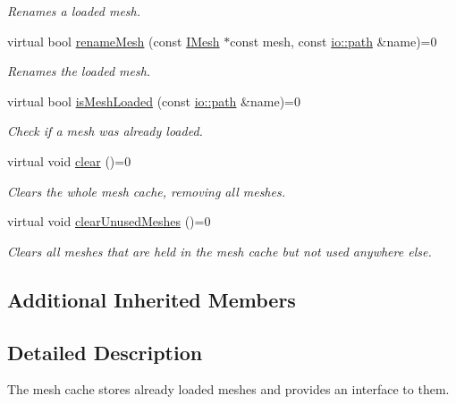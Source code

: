 \begin{DoxyCompactItemize}
\begin{DoxyCompactList}\small\item\em Renames a loaded mesh. \end{DoxyCompactList}\item 
virtual bool \hyperlink{classirr_1_1scene_1_1IMeshCache_a4533c81f4f3df112fa106d6fb1118f3b}{rename\+Mesh} (const \hyperlink{classirr_1_1scene_1_1IMesh}{I\+Mesh} $\ast$const mesh, const \hyperlink{namespaceirr_1_1io_ab1bdc45edb3f94d8319c02bc0f840ee1}{io\+::path} \&name)=0
\begin{DoxyCompactList}\small\item\em Renames the loaded mesh. \end{DoxyCompactList}\item 
virtual bool \hyperlink{classirr_1_1scene_1_1IMeshCache_a42a13fab5b76ab7142a1d47dac80548b}{is\+Mesh\+Loaded} (const \hyperlink{namespaceirr_1_1io_ab1bdc45edb3f94d8319c02bc0f840ee1}{io\+::path} \&name)=0
\begin{DoxyCompactList}\small\item\em Check if a mesh was already loaded. \end{DoxyCompactList}\item 
virtual void \hyperlink{classirr_1_1scene_1_1IMeshCache_ad92d924e558c3a7504f9154ee29b1569}{clear} ()=0
\begin{DoxyCompactList}\small\item\em Clears the whole mesh cache, removing all meshes. \end{DoxyCompactList}\item 
virtual void \hyperlink{classirr_1_1scene_1_1IMeshCache_a9f3e20b8e0f66d59bc454a311d13bbee}{clear\+Unused\+Meshes} ()=0
\begin{DoxyCompactList}\small\item\em Clears all meshes that are held in the mesh cache but not used anywhere else. \end{DoxyCompactList}\end{DoxyCompactItemize}
\subsection*{Additional Inherited Members}


\subsection{Detailed Description}
The mesh cache stores already loaded meshes and provides an interface to them. 

